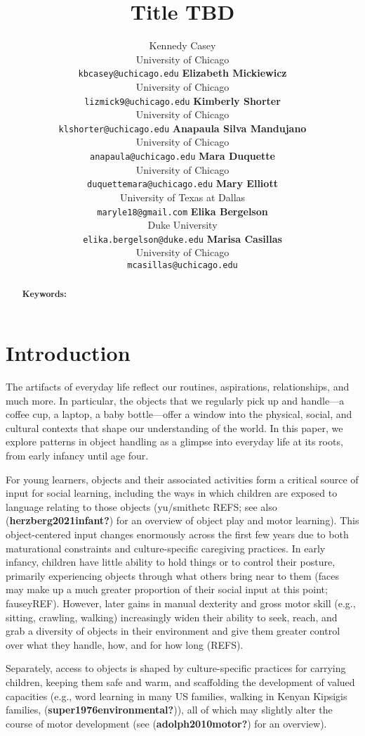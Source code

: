 \documentclass[10pt, letterpaper]{article}
\title{Title TBD}
\author{Kennedy Casey \\
        University of Chicago \\
        \texttt{kbcasey@uchicago.edu}
\And \textbf{Elizabeth Mickiewicz} \\
             University of Chicago \\
             \texttt{lizmick9@uchicago.edu}
\And \textbf{Kimberly Shorter} \\
             University of Chicago \\
             \texttt{klshorter@uchicago.edu}
\And \textbf{Anapaula Silva Mandujano} \\
             University of Chicago \\
             \texttt{anapaula@uchicago.edu}            
\AND \textbf{Mara Duquette} \\
             University of Chicago \\
             \texttt{duquettemara@uchicago.edu}
\And \textbf{Mary Elliott} \\
             University of Texas at Dallas \\
             \texttt{maryle18@gmail.com}
\And \textbf{Elika Bergelson} \\
             Duke University \\
             \texttt{elika.bergelson@duke.edu}
\And \textbf{Marisa Casillas} \\
             University of Chicago \\
             \texttt{mcasillas@uchicago.edu}}
\begin{document}
\maketitle

\begin{abstract}


\textbf{Keywords:}

\end{abstract}

\hypertarget{introduction}{%
\section{Introduction}\label{introduction}}

The artifacts of everyday life reflect our routines, aspirations,
relationships, and much more. In particular, the objects that we
regularly pick up and handle---a coffee cup, a laptop, a baby
bottle---offer a window into the physical, social, and cultural contexts
that shape our understanding of the world. In this paper, we explore
patterns in object handling as a glimpse into everyday life at its
roots, from early infancy until age four.

For young learners, objects and their associated activities form a
critical source of input for social learning, including the ways in
which children are exposed to language relating to those objects
(yu/smithetc REFS; see also (\textbf{herzberg2021infant?}) for an
overview of object play and motor learning). This object-centered input
changes enormously across the first few years due to both maturational
constraints and culture-specific caregiving practices. In early infancy,
children have little ability to hold things or to control their posture,
primarily experiencing objects through what others bring near to them
(faces may make up a much greater proportion of their social input at
this point; fauseyREF). However, later gains in manual dexterity and
gross motor skill (e.g., sitting, crawling, walking) increasingly widen
their ability to seek, reach, and grab a diversity of objects in their
environment and give them greater control over what they handle, how,
and for how long (REFS).

Separately, access to objects is shaped by culture-specific practices
for carrying children, keeping them safe and warm, and scaffolding the
development of valued capacities (e.g., word learning in many US
families, walking in Kenyan Kipsigis families,
(\textbf{super1976environmental?})), all of which may slightly alter the
course of motor development (see (\textbf{adolph2010motor?}) for an
overview).
\end{document}
